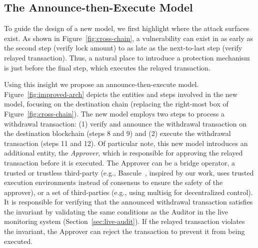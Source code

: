 \subsection{The Announce-then-Execute Model}

To guide the design of a new model, we first highlight where the
attack surfaces exist. As shown in Figure~\ref{fig:cross-chain}, a
vulnerability can exist in as early as the second step (verify lock
amount) to as late as the next-to-last step (verify relayed
transaction). Thus, a natural place to introduce a protection
mechanism is just before the final step, which executes the relayed
transaction.

Using this insight we propose an announce-then-execute model.
Figure~\ref{fig:improved-arch} depicts the entities and steps involved
in the new model, focusing on the destination chain (replacing the
right-most box of Figure~\ref{fig:cross-chain}).  The new model
employs two steps to process a withdrawal transaction: (1) verify and
announce the withdrawal transaction on the destination blockchain (steps
8 and 9) and (2) execute the withdrawal transaction (steps 11 and
12). Of particular note, this new model introduces an additional
entity, the \emph{Approver}, which is responsible for approving the
relayed transaction before it is executed.  The Approver can be a bridge
operator, a trusted or trustless third-party (e.g., Bascule~\cite{bascule},
inspired by our work, uses trusted execution environments instead of consensus to ensure the safety of the approver), or a set of
third-parties (e.g., using
multisig for decentralized control). It is responsible for
verifying that the announced withdrawal transaction satisfies the
invariant by validating the same conditions as the Auditor in the live
monitoring system (Section~\ref{sec:live-audit}).  If the relayed
transaction violates the invariant, the Approver can reject the
transaction to prevent it from being executed.



